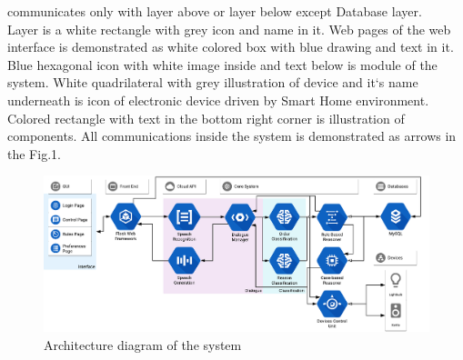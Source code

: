 \documentclass{llncs}
\begin{document}
    communicates only with layer above or layer below except Database layer.\\
    Layer is a white rectangle with grey icon and name in it.
    Web pages of the web interface is demonstrated as white colored box with blue drawing and text in it.
    Blue hexagonal icon with white image inside and text below is module of the system.
    White quadrilateral with grey illustration of device and it`s name underneath is icon of electronic device driven
    by Smart Home environment.
    Colored rectangle with text in the bottom right corner is illustration of components.
    All communications inside the system is demonstrated as arrows in the Fig.1.
    \begin{figure} \centering
        \includegraphics[trim=left botm right top, width=\textwidth, clip]{arch.png}
        \caption[]{Architecture diagram of the system}
    \end{figure}
\end{document}
